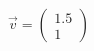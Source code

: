 \documentclass[preview]{standalone}
\begin{document}
\begin{align*}
\vec{v} = \begin{pmatrix} 1.5 \\ 1 \end{pmatrix}
\end{align*}
\end{document}

